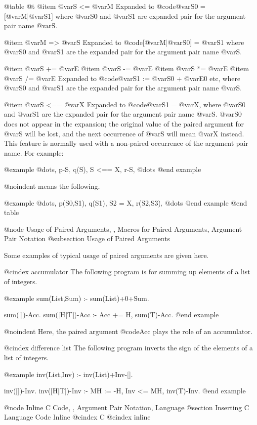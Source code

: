 @table @t
@item @var{S} <= @var{M}
Expanded to @code{@var{S0} = [@var{M}|@var{S1}]} where @var{S0} and
@var{S1} are expanded pair for the argument pair name @var{S}.

@item @var{M} => @var{S}
Expanded to @code{[@var{M}|@var{S0}] = @var{S1}} where @var{S0} and
@var{S1} are the expanded pair for the argument pair name @var{S}.

@item @var{S} += @var{E}
@item @var{S} -= @var{E}
@item @var{S} *= @var{E}
@item @var{S} /= @var{E}
Expanded to @code{@var{S1} := @var{S0} + @var{E0}} etc, where @var{S0}
and @var{S1} are the expanded pair for the argument pair name @var{S}.

@item @var{S} <== @var{X}
Expanded to @code{@var{S1} = @var{X}}, where @var{S0} and @var{S1} are
the expanded pair for the argument pair name @var{S}.  @var{S0} does not
appear in the expansion; the original value of the paired argument for
@var{S} will be lost, and the next occurrence of @var{S} will mean
@var{X} instead.  This feature is normally used with a non-paired
occurrence of the argument pair name.  For example:

@example
@dots{}, p-S, q(S), S <== X, r-S, @dots{}
@end example

@noindent
means the following.

@example
@dots{}, p(S0,S1), q(S1), S2 = X, r(S2,S3), @dots{}
@end example
@end table

@node Usage of Paired Arguments,  , Macros for Paired Arguments, Argument Pair Notation
@subsection Usage of Paired Arguments

Some examples of typical usage of paired arguments are given here.

@cindex accumulator
The following program is for summing up elements of a list of integers.

@example
sum(List,Sum) :- sum(List)+0+Sum.

sum([])-Acc.
sum([H|T])-Acc :- Acc += H, sum(T)-Acc.
@end example

@noindent
Here, the paired argument @code{Acc} plays the role of an accumulator.

@cindex difference list
The following program inverts the sign of the elements of a list of
integers.

@example
inv(List,Inv) :- inv(List)+Inv-[].

inv([])-Inv.
inv([H|T])-Inv :- MH := -H, Inv <= MH, inv(T)-Inv.
@end example

@node Inline C Code,  , Argument Pair Notation, Language
@section Inserting C Language Code Inline
@cindex C
@cindex inline

